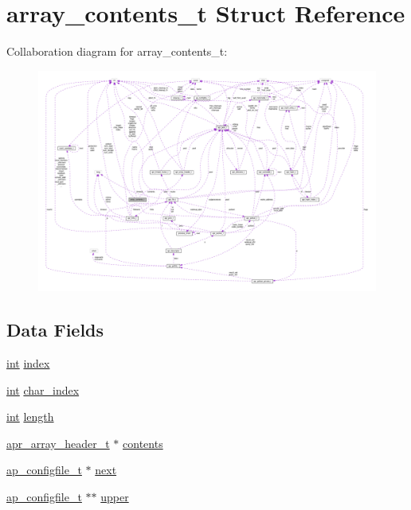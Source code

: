 \hypertarget{structarray__contents__t}{}\section{array\+\_\+contents\+\_\+t Struct Reference}
\label{structarray__contents__t}


Collaboration diagram for array\+\_\+contents\+\_\+t\+:
\nopagebreak
\begin{figure}[H]
\begin{center}
\leavevmode
\includegraphics[width=350pt]{structarray__contents__t__coll__graph}
\end{center}
\end{figure}
\subsection*{Data Fields}
\begin{DoxyCompactItemize}
\item 
\hyperlink{pcre_8txt_a42dfa4ff673c82d8efe7144098fbc198}{int} \hyperlink{structarray__contents__t_ae8876e267ad7a360c8ccfc72cc40e709}{index}
\item 
\hyperlink{pcre_8txt_a42dfa4ff673c82d8efe7144098fbc198}{int} \hyperlink{structarray__contents__t_a5dd08ad72173a0d623d63caba3c6773c}{char\+\_\+index}
\item 
\hyperlink{pcre_8txt_a42dfa4ff673c82d8efe7144098fbc198}{int} \hyperlink{structarray__contents__t_a92c2d3511ac8003a7c15c8f189c1ffd7}{length}
\item 
\hyperlink{structapr__array__header__t}{apr\+\_\+array\+\_\+header\+\_\+t} $\ast$ \hyperlink{structarray__contents__t_a9177bc5d4a5f7a99351324035999dc19}{contents}
\item 
\hyperlink{structap__configfile__t}{ap\+\_\+configfile\+\_\+t} $\ast$ \hyperlink{structarray__contents__t_a39e9035ddcd8b2dce08b0bc710af3c85}{next}
\item 
\hyperlink{structap__configfile__t}{ap\+\_\+configfile\+\_\+t} $\ast$$\ast$ \hyperlink{structarray__contents__t_a2c981ba43498a8d017299bdc9713f0c0}{upper}
\end{DoxyCompactItemize}


